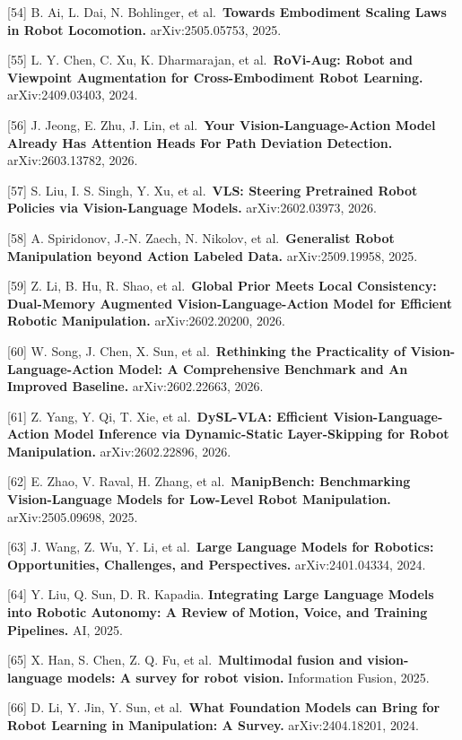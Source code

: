 {[}54{]} B. Ai, L. Dai, N. Bohlinger, et al.~\textbf{Towards Embodiment Scaling Laws in Robot Locomotion.} arXiv:2505.05753, 2025.

{[}55{]} L. Y. Chen, C. Xu, K. Dharmarajan, et al.~\textbf{RoVi-Aug: Robot and Viewpoint Augmentation for Cross-Embodiment Robot Learning.} arXiv:2409.03403, 2024.

{[}56{]} J. Jeong, E. Zhu, J. Lin, et al.~\textbf{Your Vision-Language-Action Model Already Has Attention Heads For Path Deviation Detection.} arXiv:2603.13782, 2026.

{[}57{]} S. Liu, I. S. Singh, Y. Xu, et al.~\textbf{VLS: Steering Pretrained Robot Policies via Vision-Language Models.} arXiv:2602.03973, 2026.

{[}58{]} A. Spiridonov, J.-N. Zaech, N. Nikolov, et al.~\textbf{Generalist Robot Manipulation beyond Action Labeled Data.} arXiv:2509.19958, 2025.

{[}59{]} Z. Li, B. Hu, R. Shao, et al.~\textbf{Global Prior Meets Local Consistency: Dual-Memory Augmented Vision-Language-Action Model for Efficient Robotic Manipulation.} arXiv:2602.20200, 2026.

{[}60{]} W. Song, J. Chen, X. Sun, et al.~\textbf{Rethinking the Practicality of Vision-Language-Action Model: A Comprehensive Benchmark and An Improved Baseline.} arXiv:2602.22663, 2026.

{[}61{]} Z. Yang, Y. Qi, T. Xie, et al.~\textbf{DySL-VLA: Efficient Vision-Language-Action Model Inference via Dynamic-Static Layer-Skipping for Robot Manipulation.} arXiv:2602.22896, 2026.

{[}62{]} E. Zhao, V. Raval, H. Zhang, et al.~\textbf{ManipBench: Benchmarking Vision-Language Models for Low-Level Robot Manipulation.} arXiv:2505.09698, 2025.

{[}63{]} J. Wang, Z. Wu, Y. Li, et al.~\textbf{Large Language Models for Robotics: Opportunities, Challenges, and Perspectives.} arXiv:2401.04334, 2024.

{[}64{]} Y. Liu, Q. Sun, D. R. Kapadia. \textbf{Integrating Large Language Models into Robotic Autonomy: A Review of Motion, Voice, and Training Pipelines.} AI, 2025.

{[}65{]} X. Han, S. Chen, Z. Q. Fu, et al.~\textbf{Multimodal fusion and vision-language models: A survey for robot vision.} Information Fusion, 2025.

{[}66{]} D. Li, Y. Jin, Y. Sun, et al.~\textbf{What Foundation Models can Bring for Robot Learning in Manipulation: A Survey.} arXiv:2404.18201, 2024.

